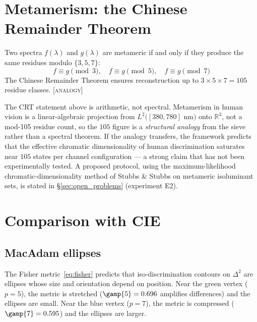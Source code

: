 \documentclass[12pt,a4paper]{article}
\begin{document}
\section{Metamerism: the Chinese Remainder Theorem}
\label{sec:metamerism}

\begin{theorembox}
Two spectra $f(\lambda)$ and $g(\lambda)$ are metameric if and only if
they produce the same residues modulo $\{3, 5, 7\}$:
\begin{equation}
  f \equiv g \pmod{3}, \quad
  f \equiv g \pmod{5}, \quad
  f \equiv g \pmod{7}
\end{equation}
The Chinese Remainder Theorem ensures reconstruction up to
$3 \times 5 \times 7 = 105$ residue classes. \textsc{[analogy]}
\end{theorembox}

\begin{remark}
The CRT statement above is arithmetic, not spectral. Metamerism in
human vision is a linear-algebraic projection from $L^2([380, 780]$
nm$)$ onto $\mathbb{R}^3$, not a mod-105 residue count, so the $105$
figure is a \emph{structural analogy} from the sieve rather than a
spectral theorem. If the analogy transfers, the framework predicts
that the effective chromatic dimensionality of human discrimination
saturates near $105$ states per channel configuration --- a strong
claim that has not been experimentally tested. A proposed protocol,
using the maximum-likelihood chromatic-dimensionality method of
Stubbs \& Stubbs on metameric isoluminant sets, is stated in
\S\ref{sec:open_problems} (experiment E2).
\end{remark}

\section{Comparison with CIE}
\label{sec:comparison}

\subsection{MacAdam ellipses}

The Fisher metric~\eqref{eq:fisher} predicts that iso-discrimination
contours on $\Delta^2$ are ellipses whose size and orientation depend
on position. Near the green vertex ($p = 5$), the metric is stretched
($\gamp{5} = 0.696$ amplifies differences) and the ellipses are small.
Near the blue vertex ($p = 7$), the metric is compressed ($\gamp{7} =
0.595$) and the ellipses are larger.
\end{document}
